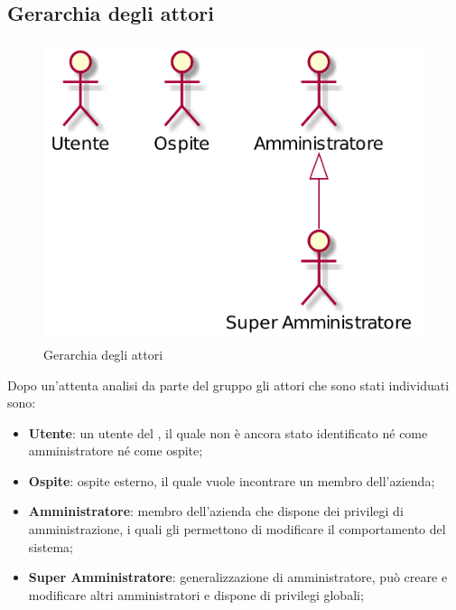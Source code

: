 \subsection{Gerarchia degli attori}
\begin{figure}[h]
  \centering
  \includegraphics[scale=0.4]{images/Attori.png}
  \caption{Gerarchia degli attori}
\end{figure}
Dopo un'attenta analisi da parte del gruppo gli attori che sono stati individuati sono: 
\begin{itemize}
\item \textbf{Utente}: un utente del , il quale non è ancora stato identificato né come amministratore né come ospite;
\item \textbf{Ospite}: ospite esterno, il quale vuole incontrare un membro dell'azienda;
\item \textbf{Amministratore}: membro dell'azienda che dispone dei privilegi di amministrazione, i quali gli permettono di modificare il comportamento del sistema;
\item \textbf{Super Amministratore}: generalizzazione di amministratore, può creare e modificare altri amministratori e dispone di privilegi globali;
\end{itemize}